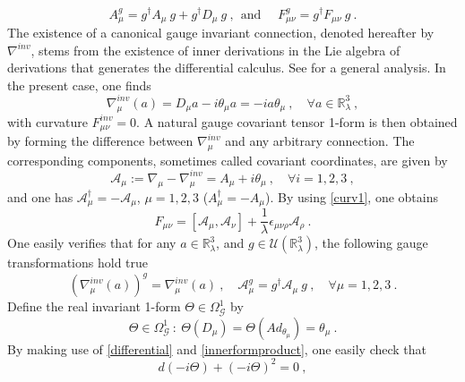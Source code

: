 \documentclass[a4paper,11pt,twoside]{article}
\numberwithin{equation}{section}
\theoremstyle{nonumberplain}
\newcounter{and}
\begin{document}
%
\begin{equation}
A_\mu^g = g^\dag A_\mu \ g + g^\dag D_\mu \ g \ , \ \ \mbox{and } \quad F^g_{\mu\nu} = g^\dag F_{\mu\nu} \ g \ \label{jauge-transfo}.
\end{equation}
%
The existence of a canonical gauge invariant connection, denoted hereafter by $\nabla^{inv}$, stems from the existence of inner derivations in the Lie algebra of derivations that generates the differential calculus. See \cite{mdv88-99} for a general analysis. In the present case, one finds
%
\begin{equation} 
\nabla^{inv}_\mu(a) = D_\mu a - i \theta_\mu a = - i a \theta_\mu \ , \quad \forall a \in \mathbb{R}^3_\lambda \ , \label{invar-connect}
\end{equation}
%
with curvature $F^{inv}_{\mu\nu}=0$. A natural gauge covariant tensor 1-form is then obtained by forming the difference between $\nabla^{inv}_\mu$ and any arbitrary connection. The corresponding components, sometimes called covariant coordinates, are given by%
%
\begin{equation}
\mathcal{A}_\mu := \nabla_\mu - \nabla^{inv}_\mu = A_\mu + i \theta_\mu \ , \quad \forall i=1,2,3 \ , \label{tens-form}
\end{equation}
%
and one has $\mathcal{A}_\mu^\dag = - \mathcal{A}_\mu$, $\mu=1,2,3$ ($A_\mu^\dag=-A_\mu$). By using \eqref{curv1}, one obtains%
%
\begin{equation} 
F_{\mu\nu} = \left[\mathcal{A}_\mu,\mathcal{A}_\nu\right] + \frac{1}{\lambda} \epsilon_{\mu\nu\rho} \mathcal{A}_\rho \ . \label{curv2}
\end{equation}
%
One easily verifies that for any $a\in\mathbb{R}^3_\lambda$, and $g\in\mathcal{U}(\mathbb{R}^3_\lambda)$, the following gauge transformations hold true%
%
\begin{equation}
(\nabla^{inv}_\mu(a))^g = \nabla^{inv}_\mu(a) \ , \quad \mathcal{A}^g_\mu = g^\dag \mathcal{A}_\mu \ g \ , \quad \forall \mu=1,2,3 \ . \label{conection-invariace}
\end{equation}
%
Define the real invariant 1-form $\Theta\in\Omega^1_\mathcal{G}$ by%
%
\begin{equation}
\Theta \in \Omega^1_\mathcal{G} \ : \ \Theta(D_\mu) = \Theta(Ad_{\theta_\mu}) = \theta_\mu \ .
\end{equation}
%
By making use of \eqref{differential} and \eqref{innerformproduct}, one easily check that%
%
\begin{equation}
d(-i\Theta)+(-i\Theta)^2=0 \ ,
\end{equation}
\end{document}
